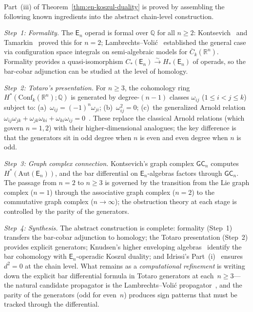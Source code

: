 \begin{remark}\label{rem:en-proof-strategy}
Part~(iii) of Theorem~\ref{thm:en-koszul-duality} is proved by
assembling the following known ingredients into the abstract
chain-level construction.

\emph{Step~1: Formality.}
The $\mathsf{E}_n$ operad is formal over $\mathbb{Q}$ for all
$n \geq 2$: Kontsevich~\cite{Kon99} and Tamarkin~\cite{Tamarkin00}
proved this for $n = 2$;
Lambrechts--Voli\'c~\cite{LambrechtsVolic14} established the
general case via configuration space integrals on semi-algebraic
models for $\overline{C}_k(\mathbb{R}^n)$.  Formality provides a
quasi-isomorphism $C_*(\mathsf{E}_n) \xrightarrow{\sim}
H_*(\mathsf{E}_n)$ of operads, so the bar-cobar adjunction can be
studied at the level of homology.

\emph{Step~2: Totaro's presentation.}
For $n \geq 3$, the cohomology ring
$H^*(\mathrm{Conf}_k(\mathbb{R}^n); \mathbb{Q})$ is generated by
degree-$(n-1)$ classes $\omega_{ij}$ ($1 \leq i < j \leq k$)
subject to: (a)~$\omega_{ij} = (-1)^n \omega_{ji}$;
(b)~$\omega_{ij}^2 = 0$; (c)~the generalized Arnold relation
$\omega_{ij}\omega_{jk} + \omega_{jk}\omega_{ki} +
\omega_{ki}\omega_{ij} = 0$~\cite{Totaro96,Coh76}.  These replace
the classical Arnold relations (which govern $n = 1, 2$) with
their higher-dimensional analogues; the key difference is that the
generators sit in odd degree when $n$ is even and even degree when
$n$ is odd.

\emph{Step~3: Graph complex connection.}
Kontsevich's graph complex $\mathsf{GC}_n$ computes
$H^*(\mathrm{Aut}(\mathsf{E}_n))$, and the bar differential on
$\mathsf{E}_n$-algebras factors through $\mathsf{GC}_n$.
The passage from $n = 2$ to $n \geq 3$ is governed by the
transition from the Lie graph complex ($n = 1$) through the
associative graph complex ($n = 2$) to the commutative graph complex
($n \to \infty$); the obstruction theory at each stage is controlled
by the parity of the generators.

\emph{Step~4: Synthesis.}
The abstract construction is complete: formality (Step~1) transfers
the bar-cobar adjunction to homology; the Totaro presentation
(Step~2) provides explicit generators; Knudsen's higher enveloping
algebras~\cite{Knudsen18} identify the bar cohomology with
$\mathsf{E}_n$-operadic Koszul duality; and Idrissi's
Part~(i)~\cite{Idrissi22} ensures $d^2 = 0$ at the chain level.
What remains as a \emph{computational refinement} is writing down
the explicit bar differential formula in Totaro generators at
each~$n \geq 3$---the natural candidate propagator is the
Lambrechts--Voli\'c propagator~\cite{LambrechtsVolic14}, and the
parity of the generators (odd for even~$n$) produces sign patterns
that must be tracked through the differential.
\end{remark}

